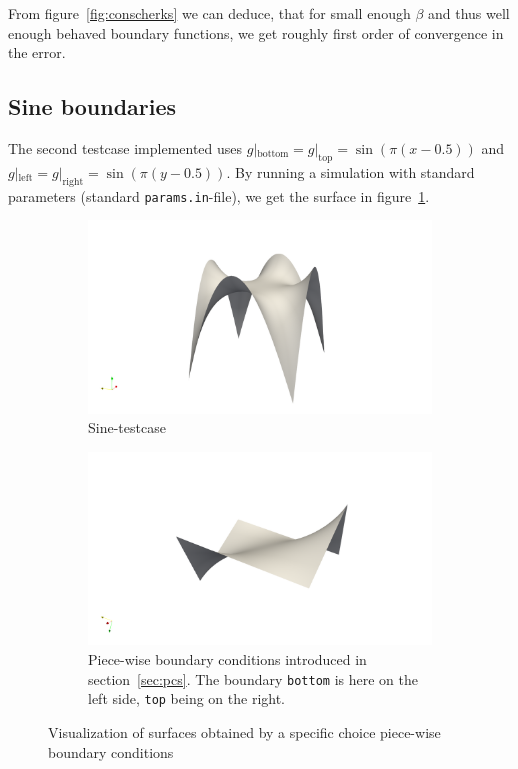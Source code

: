 \documentclass[11pt]{scrartcl}
\begin{document}
From figure~\ref{fig:conscherks} we can deduce, that for small enough $\beta$ and thus well enough behaved boundary functions, we get roughly first order of convergence in the error.

\newpage
\subsection{Sine boundaries}
The second testcase implemented uses $g|_{\text{bottom}}=g|_{\text{top}}=\sin(\pi(x-0.5))$ and $g|_{\text{left}}=g|_{\text{right}}=\sin(\pi(y-0.5))$.
By running a simulation with standard parameters (standard \texttt{params.in}-file), we get the surface in figure~\ref{fig:sine}.
\begin{figure}
	\begin{subfigure}{.49\linewidth}
		\centering
		\includegraphics[width=\linewidth]{figs/sine}
		\caption{Sine-testcase}\label{fig:sine}
	\end{subfigure}
	\hfill
	\begin{subfigure}{.49\linewidth}
		\centering
		\includegraphics[width=\linewidth]{figs/piecewise}
		\caption{Piece-wise boundary conditions introduced in section~\ref{sec:pcs}. The boundary \texttt{bottom} is here on the left side, \texttt{top} being on the right.}\label{fig:pcs}
	\end{subfigure}
	\caption{Visualization of surfaces obtained by a specific choice piece-wise boundary conditions}
\end{figure}
\end{document}
